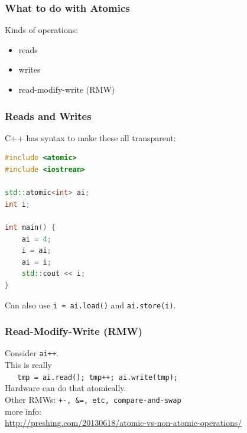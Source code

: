 \begin{frame}
  \frametitle{What to do with Atomics}

  
    \Large
    Kinds of operations:
    \begin{itemize}
    \item reads
    \item writes
    \item read-modify-write (RMW)
    \end{itemize}
  
\end{frame}

\begin{frame}[fragile]
  \frametitle{Reads and Writes}

  
    C++ has syntax to make these all transparent:
\begin{lstlisting}[language=C++]
#include <atomic>
#include <iostream>

std::atomic<int> ai;
int i;

int main() {
    ai = 4;
    i = ai;
    ai = i;
    std::cout << i;
}
\end{lstlisting}
Can also use {\tt i = ai.load()} and {\tt ai.store(i)}.
  
\end{frame}

\begin{frame}
  \frametitle{Read-Modify-Write (RMW)}

  
    Consider {\tt ai++}.\\[1em]
    This is really \\
    ~~~{\tt tmp = ai.read(); tmp++; ai.write(tmp); }\\[1em]
    Hardware can do that atomically.\\[1em]
    Other RMWs: {\tt +-, \&=, etc, compare-and-swap}\\[2em]

    {\small
      more info:\\ \url{http://preshing.com/20130618/atomic-vs-non-atomic-operations/}
      }
  
\end{frame}


